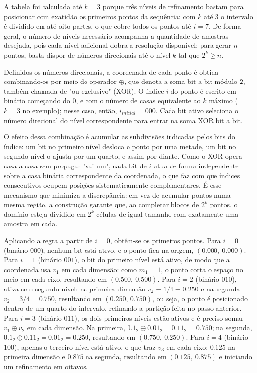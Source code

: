 \documentclass[12pt,a4paper]{article}
\begin{document}
A tabela foi calculada até $k=3$ porque três níveis de refinamento bastam para posicionar com exatidão os primeiros pontos da sequência: com $k$ até $3$ o intervalo é dividido em até oito partes, o que cobre todos os pontos até $i=7$. De forma geral, o número de níveis necessário acompanha a quantidade de amostras desejada, pois cada nível adicional dobra a resolução disponível; para gerar $n$ pontos, basta dispor de números direcionais até o nível $k$ tal que $2^k \geq n$.

Definidos os números direcionais, a coordenada de cada ponto é obtida combinando-os por meio do operador $\oplus$, que denota a soma bit a bit módulo 2, também chamada de "ou exclusivo" (XOR). O índice $i$ do ponto é escrito em binário começando do 0, e com o número de casas equivalente ao $k$ máximo ($k=3$ no exemplo); nesse caso, então, $i_{inicial} = 000$. Cada bit ativo seleciona o número direcional do nível correspondente para entrar na soma XOR bit a bit.

O efeito dessa combinação é acumular as subdivisões indicadas pelos bits do índice: um bit no primeiro nível desloca o ponto por uma metade, um bit no segundo nível o ajusta por um quarto, e assim por diante. Como o XOR opera casa a casa sem propagar "vai um", cada bit de $i$ atua de forma independente sobre a casa binária correspondente da coordenada, o que faz com que índices consecutivos ocupem posições sistematicamente complementares. É esse mecanismo que minimiza a discrepância: em vez de acumular pontos numa mesma região, a construção garante que, ao completar blocos de $2^k$ pontos, o domínio esteja dividido em $2^k$ células de igual tamanho com exatamente uma amostra em cada.

Aplicando a regra a partir de $i=0$, obtêm-se os primeiros pontos. Para $i=0$ (binário $000$), nenhum bit está ativo, e o ponto fica na origem, $(0.000,\ 0.000)$. Para $i=1$ (binário $001$), o bit do primeiro nível está ativo, de modo que a coordenada usa $v_1$ em cada dimensão: como $m_1=1$, o ponto corta o espaço no meio em cada eixo, resultando em $(0.500,\ 0.500)$. Para $i=2$ (binário $010$), ativa-se o segundo nível: na primeira dimensão $v_2 = 1/4 = 0.250$ e na segunda $v_2 = 3/4 = 0.750$, resultando em $(0.250,\ 0.750)$, ou seja, o ponto é posicionado dentro de um quarto do intervalo, refinando a partição feita no passo anterior. Para $i=3$ (binário $011$), os dois primeiros níveis estão ativos e é preciso somar $v_1 \oplus v_2$ em cada dimensão. Na primeira, $0.1_2 \oplus 0.01_2 = 0.11_2 = 0.750$; na segunda, $0.1_2 \oplus 0.11_2 = 0.01_2 = 0.250$, resultando em $(0.750,\ 0.250)$. Para $i=4$ (binário $100$), apenas o terceiro nível está ativo, o que traz $v_3$ em cada eixo: $0.125$ na primeira dimensão e $0.875$ na segunda, resultando em $(0.125,\ 0.875)$ e iniciando um refinamento em oitavos.
\end{document}
